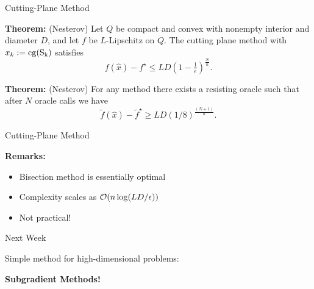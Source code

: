 \documentclass[9pt]{beamer}
\begin{document}
\begin{frame}{Cutting-Plane Method}

  \textbf{Theorem:} (Nesterov) Let $Q$ be compact and convex with nonempty interior and diameter $D$, and let $f$ be $L$-Lipschitz on $Q$. The cutting plane method with $x_k:= \rm{cg}(S_k)$ satisfies
  \[
    f(\hat x) - f^\star \leq L D (1-\tfrac 1e)^{\tfrac N n}.
  \]

  \vfill

  \textbf{Theorem:} (Nesterov) For any method there exists a resisting oracle such that after $N$ oracle calls we have
  \[
    \tilde f(\hat x) - \tilde f^\star \geq L D (1/8)^{\tfrac {(N+1)} n}.
  \]
  

\end{frame}

\begin{frame}{Cutting-Plane Method}

  \textbf{Remarks:}

  \begin{itemize}
  \item Bisection method is essentially optimal
  \item Complexity scales as $\mathcal O(n \log(LD/\epsilon))$
  \item<2-> Not practical!
  \end{itemize}

  
\end{frame}

\begin{frame}{Next Week}

  Simple method for high-dimensional problems:
  \vfill
  \begin{center}
    \textbf{Subgradient Methods!}
  \end{center}
  
\end{frame}
\end{document}
